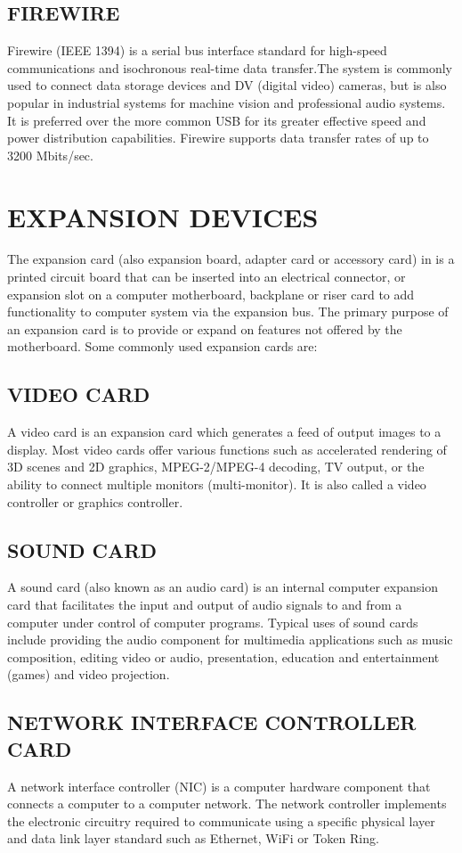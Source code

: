 \documentclass{article}
\begin{document}
\subsection{ FIREWIRE}
 Firewire (IEEE 1394) is a serial bus interface standard for high-speed communications
and isochronous real-time data transfer.The system is commonly used to connect data storage
devices and DV (digital video) cameras, but is also popular in industrial systems for machine vision and
professional audio systems. It is preferred over the more common USB for its greater effective speed and
power distribution capabilities. Firewire supports data transfer rates of up to 3200 Mbits/sec.
\section{EXPANSION DEVICES}
The expansion card (also expansion board, adapter card or accessory card) in is a printed circuit board that can
be inserted into an electrical connector, or expansion slot on a computer motherboard, backplane or riser card to
add functionality to computer system via the expansion bus. The primary purpose of an expansion card is to
provide or expand on features not offered by the motherboard. Some commonly used expansion cards are:
\subsection{VIDEO CARD} 
A video card is an expansion card which generates a feed of output images to a display.
Most video cards offer various functions such as accelerated rendering of 3D scenes and 2D graphics,
MPEG-2/MPEG-4 decoding, TV output, or the ability to connect multiple monitors (multi-monitor). It is
also called a video controller or graphics controller.
\subsection{SOUND CARD}
 A sound card (also known as an audio card) is an internal computer expansion card that
facilitates the input and output of audio signals to and from a computer under control of computer
programs. Typical uses of sound cards include providing the audio component for multimedia applications
such as music composition, editing video or audio, presentation, education and entertainment (games) and
video projection.
\subsection{ NETWORK INTERFACE CONTROLLER CARD}
 A network interface controller (NIC) is a computer hardware component
that connects a computer to a computer network. The network controller implements the electronic circuitry
required to communicate using a specific physical layer and data link layer standard such as Ethernet, WiFi
or Token Ring.
\end{document}
